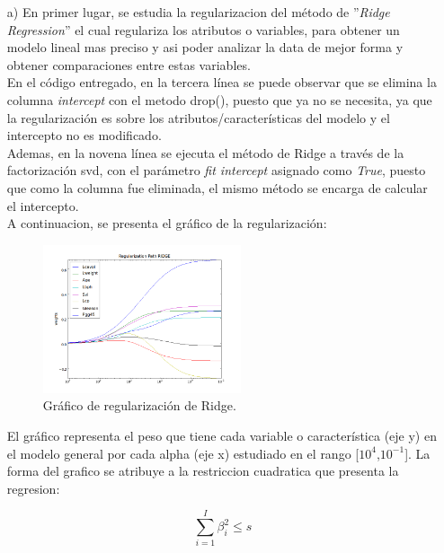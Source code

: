 \documentclass[10pt]{article}
\begin{document}
\begin{itemize}

\item[a)] En primer lugar, se estudia la regularizacion del método de ''\textit{Ridge Regression}'' el cual regulariza los atributos o variables, para obtener un modelo lineal mas preciso y asi poder analizar la data de mejor forma y obtener comparaciones entre estas variables.\\
En el código entregado, en la tercera línea se puede observar que se elimina la columna \textit{ intercept} con el metodo drop(), puesto que ya no se necesita, ya que la regularización es sobre los atributos/características del modelo y el intercepto no es modificado.\\
Ademas, en la novena línea se ejecuta el método de Ridge a través de la factorización svd, con el parámetro \textit{fit intercept} asignado como \textit{True}, puesto que como la columna fue eliminada, el mismo método se encarga de calcular el intercepto.\\

A continuacion, se presenta el gráfico de la regularización:\\

\begin{figure}[!htb]
    \centering
    \includegraphics[width=0.55\textwidth]{images/regularization_ridge}
    \caption{Gráfico de regularización de Ridge.}
    \label{fig:mesh1}
\end{figure}

El gráfico representa el peso que tiene cada variable o característica (eje y) en el modelo general por cada alpha (eje x) estudiado en el rango [$10^4$,$10^{-1}$]. La forma del grafico se atribuye a la restriccion cuadratica que presenta la regresion:

\begin{equation} \label{ridge}
\sum_{i=1}^I \beta_i^2 \leq s
\end{equation} 


\end{itemize}
\end{document}
